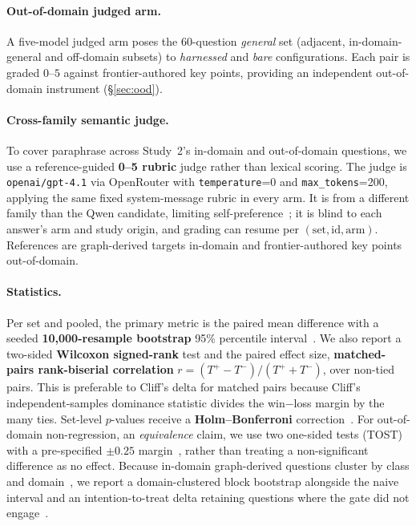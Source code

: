 \documentclass[10pt,twocolumn]{article}
\begin{document}
\paragraph{Out-of-domain judged arm.} A five-model judged arm poses the 60-question \emph{general} set (adjacent, in-domain-general and off-domain subsets) to \emph{harnessed} and \emph{bare} configurations. Each pair is graded $0$--$5$ against frontier-authored key points, providing an independent out-of-domain instrument (\S\ref{sec:ood}).

\paragraph{Cross-family semantic judge.} To cover paraphrase across Study~2's in-domain and out-of-domain questions, we use a reference-guided \textbf{0--5 rubric} judge rather than lexical scoring. The judge is \texttt{openai/gpt-4.1} via OpenRouter with \texttt{temperature}=0 and \texttt{max\_tokens}=200, applying the same fixed system-message rubric in every arm. It is from a different family than the Qwen candidate, limiting self-preference~\cite{zheng2023judging,panickssery2024selfpreference}; it is blind to each answer's arm and study origin, and grading can resume per $(\text{set},\text{id},\text{arm})$. References are graph-derived targets in-domain and frontier-authored key points out-of-domain.

\paragraph{Statistics.} Per set and pooled, the primary metric is the paired mean difference with a seeded \textbf{10{,}000-resample bootstrap} 95\% percentile interval~\cite{efron1979bootstrap,koehn2004significance}. We also report a two-sided \textbf{Wilcoxon signed-rank} test and the paired effect size, \textbf{matched-pairs rank-biserial correlation} $r=(T^{+}-T^{-})/(T^{+}+T^{-})$, over non-tied pairs. This is preferable to Cliff's delta for matched pairs because Cliff's independent-samples dominance statistic divides the win$-$loss margin by the many ties. Set-level $p$-values receive a \textbf{Holm--Bonferroni} correction~\cite{dror2018hitchhiker}. For out-of-domain non-regression, an \emph{equivalence} claim, we use two one-sided tests (TOST) with a pre-specified $\pm0.25$ margin~\cite{lakens2017equivalence}, rather than treating a non-significant difference as no effect. Because in-domain graph-derived questions cluster by class and domain~\cite{dror2018hitchhiker}, we report a domain-clustered block bootstrap alongside the naive interval and an intention-to-treat delta retaining questions where the gate did not engage~\cite{hollis1999itt}.
\end{document}
